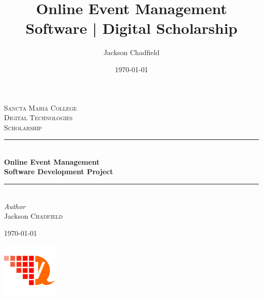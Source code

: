 \documentclass[a4paper,oneside,12pt]{report}
\title{Online Event Management Software | Digital Scholarship}
\author{Jackson Chadfield}
\date{\today}
\begin{document}
	\listoftodos

	\begin{titlepage} %
		\newcommand{\HRule}{\rule{\linewidth}{0.5mm}} %

		\center %



		\textsc{\LARGE Sancta Maria College}\\[1.5cm] %

		\textsc{\Large Digital Technologies}\\[0.5cm] %

		\textsc{\large Scholarship}\\[0.5cm] %


		\HRule\\[0.4cm]

		{\huge\bfseries Online Event Management\\Software Development Project}\\[0.4cm] %

		\HRule\\[1.5cm]


		{\large\textit{Author}}\\
		Jackson \textsc{Chadfield} %


		\vfill\vfill\vfill %

		{\large\today} %


		\vfill\vfill
		\includegraphics[width=0.2\textwidth]{static/logo.png}\\[1cm] %

		\vfill

	\end{titlepage}
\end{document}
